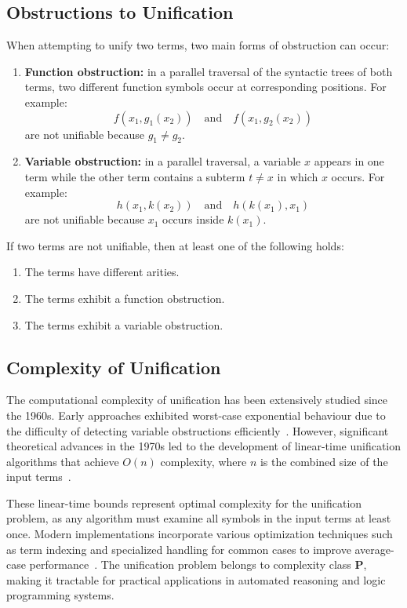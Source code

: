 \subsection{Obstructions to Unification}
When attempting to unify two terms, two main forms of obstruction can occur:
\begin{enumerate}
    \item \textbf{Function obstruction:} in a parallel traversal of the syntactic trees of both terms, two different function symbols occur at corresponding positions. For example:
    \[
    f(x_1, g_1(x_2)) \quad\text{and}\quad f(x_1, g_2(x_2))
    \]
    are not unifiable because \(g_1 \neq g_2\).
    \item \textbf{Variable obstruction:} in a parallel traversal, a variable \(x\) appears in one term while the other term contains a subterm \(t \neq x\) in which \(x\) occurs. For example:
    \[
    h(x_1, k(x_2)) \quad\text{and}\quad h(k(x_1), x_1)
    \]
    are not unifiable because \(x_1\) occurs inside \(k(x_1)\).
\end{enumerate}

\begin{proposition}
If two terms are not unifiable, then at least one of the following holds:
\begin{enumerate}
    \item The terms have different arities.
    \item The terms exhibit a function obstruction.
    \item The terms exhibit a variable obstruction.
\end{enumerate}
\end{proposition}

\subsection{Complexity of Unification}
The computational complexity of unification has been extensively studied since the 1960s.
Early approaches exhibited worst-case exponential behaviour due to the difficulty of detecting variable obstructions efficiently~\cite{robinson1965}.
However, significant theoretical advances in the 1970s led to the development of linear-time unification algorithms that achieve \(O(n)\) complexity, where \(n\) is the combined size of the input terms~\cite{martelli1976, paterson1978}.

These linear-time bounds represent optimal complexity for the unification problem, as any algorithm must examine all symbols in the input terms at least once.
Modern implementations incorporate various optimization techniques such as term indexing and specialized handling for common cases to improve average-case performance~\cite{baader2001}.
The unification problem belongs to complexity class \textbf{P}, making it tractable for practical applications in automated reasoning and logic programming systems.


